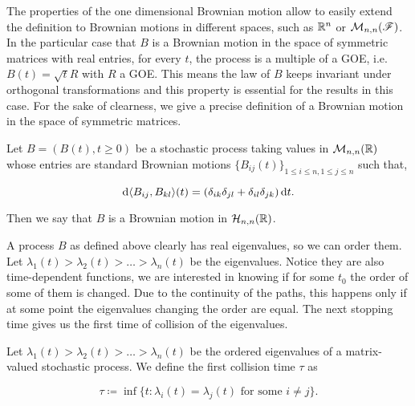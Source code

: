 The properties of the one dimensional Brownian motion allow to easily extend the definition to Brownian motions in different spaces, such as $\mathbb R^n$ or $\mathcal M_{n,n}(\mathscr F)$. In the particular case that $B$ is a Brownian motion in the space of symmetric matrices with real entries, for every $t$, the process is a multiple of a GOE, i.e. $B(t) = \sqrt{t}R$ with $R$ a GOE. This means the law of $B$ keeps invariant under orthogonal transformations and this property is essential for the results in this case. For the sake of clearness, we give a precise definition of a Brownian motion in the space of symmetric matrices.

\begin{definition} \label{def:sym_bm}
    Let $B = (B(t), t \ge 0)$ be a stochastic process taking values in $\mathcal M_{n,n}(\mathbb R)$ whose entries are standard Brownian motions $\{B_{ij}(t)\}_{1 \le i \le n, 1 \le j \le n}$ such that,

    \begin{equation*}
        \mathrm d \langle B_{ij}, B_{kl} \rangle(t) = \left(\delta_{ik}\delta_{jl} + \delta_{il}\delta_{jk}\right) \mathrm d t.
    \end{equation*}

    Then we say that $B$ is a Brownian motion in $\mathcal H_{n,n}(\mathbb R)$.
\end{definition}

A process $B$ as defined above clearly has real eigenvalues, so we can order them. Let $\lambda_1(t) > \lambda_2(t) > \dots > \lambda_n(t)$ be the eigenvalues. Notice they are also time-dependent functions, we are interested in knowing if for some $t_0$ the order of some of them is changed. Due to the continuity of the paths, this happens only if at some point the eigenvalues changing the order are equal. The next stopping time gives us the first time of collision of the eigenvalues.

\begin{definition}
    Let $\lambda_1(t) > \lambda_2(t) > \dots > \lambda_n(t)$ be the  ordered eigenvalues of a matrix-valued stochastic process. We define the first collision time $\tau$ as 

    \begin{equation}
        \tau \coloneqq \inf\{ t: \lambda_i(t) = \lambda_j(t) \text{ for some } i\neq j \}. \label{eq:collision_time_dyson}
    \end{equation} 
\end{definition}

